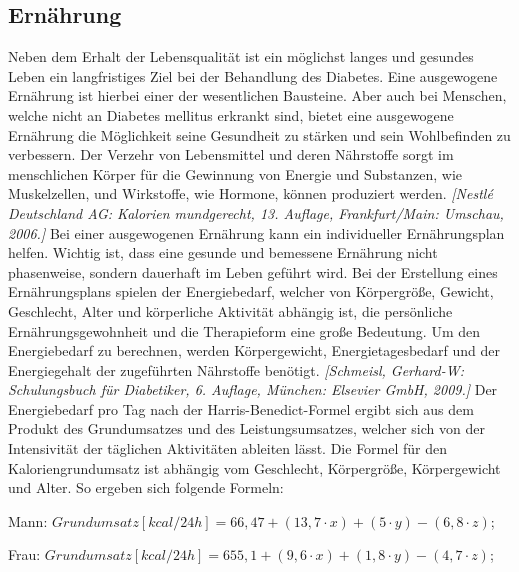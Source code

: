 \documentclass[a4paper,11pt]{article}%
\renewcommand{\\}{\vspace*{0.5\baselineskip} \newline}
\begin{document}
\subsection{Ernährung}
	Neben dem Erhalt der Lebensqualität ist ein möglichst langes und gesundes Leben ein langfristiges Ziel bei der Behandlung des Diabetes. Eine ausgewogene Ernährung ist hierbei einer der wesentlichen Bausteine. Aber auch bei Menschen, welche nicht an Diabetes mellitus erkrankt sind, bietet eine ausgewogene Ernährung die Möglichkeit seine Gesundheit zu stärken und sein Wohlbefinden zu verbessern. \newline	
	Der Verzehr von Lebensmittel und deren Nährstoffe sorgt im menschlichen Körper für die Gewinnung von Energie und Substanzen, wie Muskelzellen, und Wirkstoffe, wie Hormone, können produziert werden. \emph{[Nestlé Deutschland AG: Kalorien mundgerecht, 13. Auflage, Frankfurt/Main: Umschau, 2006.]} \\
	Bei einer ausgewogenen Ernährung kann ein individueller Ernährungsplan helfen. Wichtig ist, dass eine gesunde und bemessene Ernährung nicht phasenweise, sondern dauerhaft im Leben geführt wird. Bei der Erstellung eines Ernährungsplans spielen der Energiebedarf, welcher von Körpergröße, Gewicht, Geschlecht, Alter und körperliche Aktivität abhängig ist, die persönliche Ernährungsgewohnheit und die Therapieform eine große Bedeutung. Um den Energiebedarf zu berechnen, werden Körpergewicht, Energietagesbedarf und der Energiegehalt der zugeführten Nährstoffe benötigt. \emph{[Schmeisl, Gerhard-W: Schulungsbuch für Diabetiker, 6. Auflage, München: Elsevier GmbH, 2009.]} \newline
	Der Energiebedarf pro Tag nach der Harris-Benedict-Formel ergibt sich aus dem Produkt des Grundumsatzes und des Leistungsumsatzes, welcher sich von der Intensivität der täglichen Aktivitäten ableiten lässt. Die Formel für den Kaloriengrundumsatz ist abhängig vom Geschlecht, Körpergröße, Körpergewicht und Alter. So ergeben sich folgende Formeln: \newline
	\\
		\centerline{Mann: $Grundumsatz [kcal/ 24h] {=} 66,47 + (13,7 \cdot x) + (5 \cdot y) - (6,8 \cdot z)$;}\\
		\centerline{Frau: $Grundumsatz [kcal/ 24h] {=} 655,1 + (9,6 \cdot x) + (1,8 \cdot y) - (4,7 \cdot z)$;}\\
		\noindent\hspace*{16mm}{x = Körpergewicht [kg];}\newline
		\noindent\hspace*{16mm}{y = Körpergröße [cm];}\newline
\end{document}
